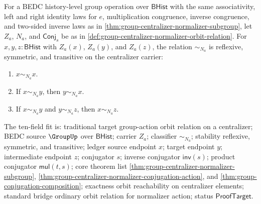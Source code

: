 \begin{theorem}
\label{thm:group-centralizer-normalizer-orbit-equivalence}
For a BEDC history-level group operation over $\mathsf{BHist}$ with the same
associativity, left and right identity laws for $e$, multiplication
congruence, inverse congruence, and two-sided inverse laws as in
\autoref{thm:group-centralizer-normalizer-subgroup}, let $Z_a$, $N_a$, and
$\mathsf{Conj}_s$ be as in
\autoref{def:group-centralizer-normalizer-orbit-relation}. For
$x,y,z:\mathsf{BHist}$ with $Z_a(x)$, $Z_a(y)$, and $Z_a(z)$, the relation
$\sim_{N_a}$ is reflexive, symmetric, and transitive on the centralizer
carrier:
\begin{enumerate}
\item $x\sim_{N_a}x$.
\item If $x\sim_{N_a}y$, then $y\sim_{N_a}x$.
\item If $x\sim_{N_a}y$ and $y\sim_{N_a}z$, then $x\sim_{N_a}z$.
\end{enumerate}
The ten-field fit is: traditional target group-action orbit relation on a
centralizer; BEDC source $\GroupUp$ over $\mathsf{BHist}$; carrier $Z_a$;
classifier $\sim_{N_a}$; stability reflexive, symmetric, and transitive;
ledger source endpoint $x$; target endpoint $y$; intermediate endpoint $z$;
conjugator $s$; inverse conjugator $\mathsf{inv}(s)$; product conjugator
$\mathsf{mul}(t,s)$; core theorem list
\autoref{thm:group-centralizer-normalizer-subgroup},
\autoref{thm:group-centralizer-normalizer-conjugation-action}, and
\autoref{thm:group-conjugation-composition}; exactness orbit reachability on
centralizer elements; standard bridge ordinary orbit relation for normalizer
action; status $\mathsf{ProofTarget}$.
\end{theorem}
